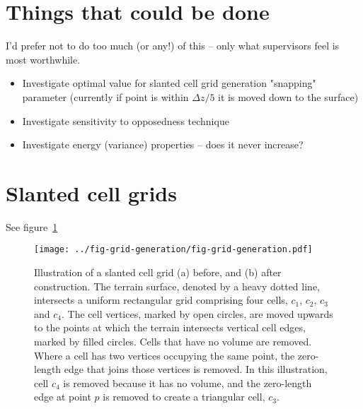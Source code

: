 \documentclass{article}
\begin{document}
\section{Things that could be done}
I'd prefer not to do too much (or any!) of this -- only what supervisors feel is most worthwhile.
\begin{itemize}
	\item Investigate optimal value for slanted cell grid generation "snapping" parameter (currently if point is within $\Delta z/5$ it is moved down to the surface)
	\item Investigate sensitivity to opposedness technique
	\item Investigate energy (variance) properties -- does it never increase?
\end{itemize}

\section{Slanted cell grids}
See figure~\ref{fig:grid-generation}
\begin{figure}
	\centering
	\texttt{[image: ../fig-grid-generation/fig-grid-generation.pdf]}
	\caption{Illustration of a slanted cell grid (a) before, and (b) after construction.
	The terrain surface, denoted by a heavy dotted line, intersects a uniform rectangular grid comprising four cells, $c_1$, $c_2$, $c_3$ and $c_4$.  The cell vertices, marked by open circles, are moved upwards to the points at which the terrain intersects vertical cell edges, marked by filled circles.  Cells that have no volume are removed.  Where a cell has two vertices occupying the same point, the zero-length edge that joins those vertices is removed.  In this illustration, cell $c_4$ is removed because it has no volume, and the zero-length edge at point $p$ is removed to create a triangular cell, $c_3$.}
	\label{fig:grid-generation}
\end{figure}
\clearpage
\end{document}

